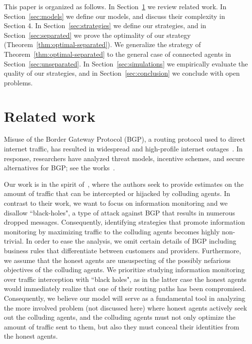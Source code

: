 \documentclass[reprint]{revtex4-1}
\begin{document}
This paper is organized as follows. In Section~\ref{sec:related} we review 
related work. In Section~\ref{sec:models} we define our models, and discuss their complexity in Section 4. In Section~\ref{sec:strategies} we define
our strategies, and in Section~\ref{sec:separated} we prove the optimality of our strategy (Theorem~\ref{thm:optimal-separated}). We generalize the strategy of Theorem~\ref{thm:optimal-separated} to
the general case of connected agents in Section~\ref{sec:unseparated}. In
Section~\ref{sec:simulations} we empirically evaluate the quality of our
strategies, and in Section~\ref{sec:conclusion} we conclude with open problems.


\section{Related work} \label{sec:related}
Misuse of the Border Gateway Protocol (BGP), a routing protocol used to direct
internet traffic, has resulted in widespread and high-profile internet
outages~\cite{Stone08}. In response, researchers have analyzed threat models,
incentive schemes, and secure alternatives for BGP; see the
works~\cite{ButlerFMR10,GoldbergSHR10,BallaniFZ07,NordstromD04,GoldbergHJRW08,LevinSZ08}.

Our work is in the spirit of~\cite{BallaniFZ07}, where the 
authors seek to provide estimates on the amount of traffic that can be intercepted or 
hijacked by colluding agents.  In contrast to their work, we want to focus on 
information monitoring and we disallow ``black-holes", a type of attack against BGP 
that results in numerous dropped messages.  Consequently, identifying strategies 
that promote information monitoring by maximizing traffic to the colluding agents  
becomes highly non-trivial.  In order to ease the analysis, we omit certain details of 
BGP including business rules that differentiate between customers and providers.  
Furthermore, we assume that the honest agents are unsuspecting of the possibly
nefarious objectives of the colluding agents.  We prioritize studying information 
monitoring over traffic interception with ``black holes", as in the latter case the 
honest agents would immediately realize that one of their routing paths has been 
compromised.  Consequently, we believe our model will serve as a fundamental 
tool in analyzing the more involved problem (not discussed here) where honest 
agents actively seek out the colluding agents, and the colluding agents must
not only optimize the amount of traffic sent to them, but also they must conceal their identities from the honest agents. 
\end{document}
